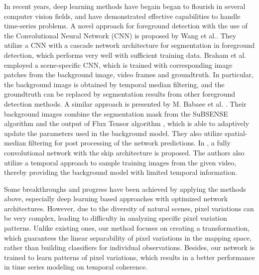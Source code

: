 \documentclass[journal]{IEEEtran}
\begin{document}
%
In recent years, deep learning methods have begain began to flourish in several computer vision fields, 
and have demonstrated effective capabilities to handle time-series problems\cite{Mobahi2009}\cite{LANGKVIST201411}. 
%
A novel approach for foreground detection with the use of the Convolutional Neural Network (CNN) is proposed by Wang et al.\cite{wang2016PRL}.
They utilize a CNN with a cascade network architecture for segmentation in foreground detection, which performs very well with sufficient training data.
%
Braham et al. \cite{Braham2016deep} employed a scene-specific CNN, 
which is trained with corresponding image patches from the background image, video frames and groundtruth. 
In particular, the background image is obtained by temporal median filtering, and the groundtruth can be replaced by segmentation results from other foreground detection methods.
A similar approach is presented by M. Babaee et al. \cite{Babaee2017deep}. 
Their background images combine the segmentation mask from the SuBSENSE\cite{St-Charles2015SuBSENSE} algorithm and the output of Flux Tensor algorithm \cite{Wang2014FTSG}, which is able to adaptively update the parameters used in the background model. 
They also utilize spatial-median filtering for post processing of the network predictions.
In \cite{Yang2018DBMF}, a fully convolutional network with the skip architecture is proposed. 
The authors also utilize a temporal approach to sample training images from the given video, 
thereby providing the background model with limited temporal information. 

Some breakthroughs and progress have been achieved by applying the methods above, especially deep learning based approaches with optimized network architectures. 
However, due to the diversity of natural scenes, pixel variations can be very complex, leading to difficulty in analyzing specific pixel variation patterns.
Unlike existing ones, our method focuses on creating a transformation, which guarantees the linear separability of pixel variations in the mapping space, rather than building classifiers for individual observations.
%
Besides, our network is trained to learn patterns of pixel variations, which results in a better performance in time series modeling on temporal coherence.
%
\end{document}
